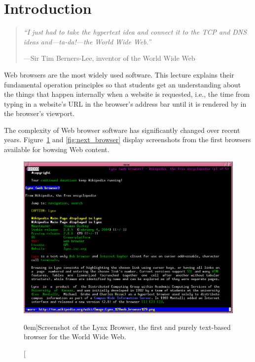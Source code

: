 \documentclass[a4paper, justified, notoc]{tufte-handout} %
\begin{document}
\section{Introduction}\label{sec:introduction}
\begin{quote}
	\emph{``I just had to take the hypertext idea and connect it to the TCP and DNS ideas and—ta-da!—the World Wide Web.''}\begin{flushright}\vspace{-1em}---Sir Tim Berners-Lee, inventor of the World Wide Web \end{flushright}
\end{quote}



Web browsers are the most widely used software.
This lecture explains their fundamental operation principles so that students get an understanding about the things that happen internally when a website is requested, i.e., the time from typing in a website's URL in the browser's address bar until it is rendered by in the browser's viewport.

The complexity of Web browser software has significantly changed over recent years. Figure~\ref{fig:lynx} and \ref{fig:next_browser} display screenshots from the first browsers available for bowsing Web content.

\begin{figure}%
	\centering
  \includegraphics[width=1.0\textwidth]{./figures/lynx_browser.png}
  \caption[][0em]{Screenshot of the Lynx Browser, the first and purely text-based browser for the World Wide Web.}
  \label{fig:lynx}
\end{figure}
\end{document}
